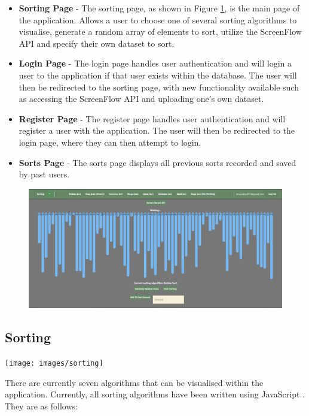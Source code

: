 \begin{itemize}
    \item \textbf{Sorting Page} - The sorting page, as shown in Figure \ref{fig:main_page}, is the main page of the application. Allows a user to choose one of several sorting algorithms to visualise, generate a random array of elements to sort, utilize the ScreenFlow API and specify their own dataset to sort.
    \item \textbf{Login Page} - The login page handles user authentication and will login a user to the application if that user exists within the database. The user will then be redirected to the sorting page, with new functionality available such as accessing the ScreenFlow API and uploading one's own dataset.
    \item \textbf{Register Page} - The register page handles user authentication and will register a user with the application. The user will then be redirected to the login page, where they can then attempt to login.
    \item \textbf{Sorts Page} - The sorts page displays all previous sorts recorded and saved by past users.
\end{itemize}

\begin{figure}[!h]
    \centering
    \includegraphics[scale=.35]{images/web_app_main}
    \label{fig:main_page}
\end{figure}

\subsection{Sorting}
\begin{center}
    \texttt{[image: images/sorting]}
    \label{fig:main_page}
\end{center}
There are currently seven algorithms that can be visualised within the application. Currently, all sorting algorithms have been written using JavaScript \cite{sortalgs_guide}. They are as follows:

